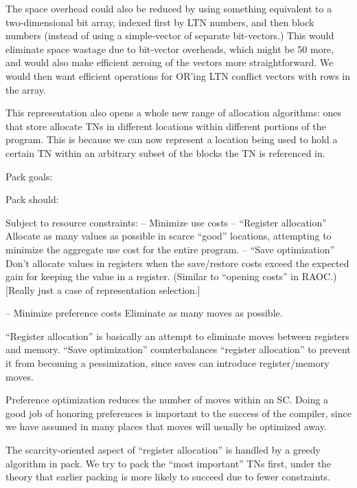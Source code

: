 The space overhead could also be reduced by using something equivalent to a
two-dimensional bit array, indexed first by LTN numbers, and then block numbers
(instead of using a simple-vector of separate bit-vectors.)  This would
eliminate space wastage due to bit-vector overheads, which might be 50%
more, and would also make efficient zeroing of the vectors more
straightforward.  We would then want efficient operations for OR'ing LTN
conflict vectors with rows in the array.

This representation also opens a whole new range of allocation algorithms: ones
that store allocate TNs in different locations within different portions of the
program.  This is because we can now represent a location being used to hold a
certain TN within an arbitrary subset of the blocks the TN is referenced in.









Pack goals:

Pack should:

Subject to resource constraints:
 -- Minimize use costs
     -- ``Register allocation''
         Allocate as many values as possible in scarce ``good'' locations,
         attempting to minimize the aggregate use cost for the entire program.
     -- ``Save optimization''
         Don't allocate values in registers when the save/restore costs exceed
         the expected gain for keeping the value in a register.  (Similar to
         ``opening costs'' in RAOC.)  [Really just a case of representation
         selection.]

 -- Minimize preference costs
    Eliminate as many moves as possible.


``Register allocation'' is basically an attempt to eliminate moves between
registers and memory.  ``Save optimization'' counterbalances ``register
allocation'' to prevent it from becoming a pessimization, since saves can
introduce register/memory moves.

Preference optimization reduces the number of moves within an SC.  Doing a good
job of honoring preferences is important to the success of the compiler, since
we have assumed in many places that moves will usually be optimized away.

The scarcity-oriented aspect of ``register allocation'' is handled by a greedy
algorithm in pack.  We try to pack the ``most important'' TNs first, under the
theory that earlier packing is more likely to succeed due to fewer constraints.


